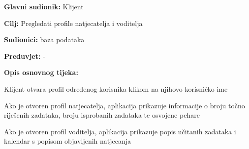 					
					\noindent {}
					\begin{packed_item}
						
						\item \textbf{Glavni sudionik: }Klijent
						\item \textbf{Cilj:} Pregledati profile natjecatelja i voditelja
						\item \textbf{Sudionici:} baza podataka
						\item \textbf{Preduvjet:} -
						\item \textbf{Opis osnovnog tijeka:}
						
						\item[] \begin{packed_enum}
							\item Klijent otvara profil određenog korisnika klikom na njihovo korisničko ime
							\item Ako je otvoren profil natjecatelja, aplikacija prikazuje informacije o broju točno riješenih zadataka, broju isprobanih zadataka te osvojene pehare
							\item Ako je otvoren profil voditelja, aplikacija prikazuje popis učitanih zadataka i kalendar s popisom objavljenih natjecanja
						\end{packed_enum}
					\end{packed_item}
					
					
					
